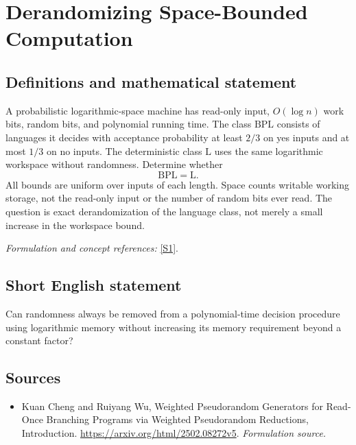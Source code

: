 \documentclass[11pt]{article}
\begin{document}
\section*{\texorpdfstring{Derandomizing Space-Bounded Computation}{Derandomizing Space-Bounded Computation}}\label{statement}
\subsection{Definitions and mathematical statement}
A probabilistic logarithmic-space machine has read-only input, $O(\log n)$ work bits, random bits, and polynomial running time. The class $\mathrm{BPL}$ consists of languages it decides with acceptance probability at least $2/3$ on yes inputs and at most $1/3$ on no inputs. The deterministic class $\mathrm L$ uses the same logarithmic workspace without randomness. Determine whether
\[
 \mathrm{BPL}=\mathrm L.
\]
All bounds are uniform over inputs of each length. Space counts writable working storage, not the read-only input or the number of random bits ever read. The question is exact derandomization of the language class, not merely a small increase in the workspace bound.
\par\smallskip\textit{Formulation and concept references:} \href{https://arxiv.org/html/2502.08272v5}{[S1]}.

\subsection{Short English statement}
Can randomness always be removed from a polynomial-time decision procedure using logarithmic memory without increasing its memory requirement beyond a constant factor?
\subsection{Sources}
\begin{itemize}
\item[S1]Kuan Cheng and Ruiyang Wu, Weighted Pseudorandom Generators for Read-Once Branching Programs via Weighted Pseudorandom Reductions, Introduction.
\url{https://arxiv.org/html/2502.08272v5}.
\textit{Formulation source.}
\end{itemize}
\end{document}

